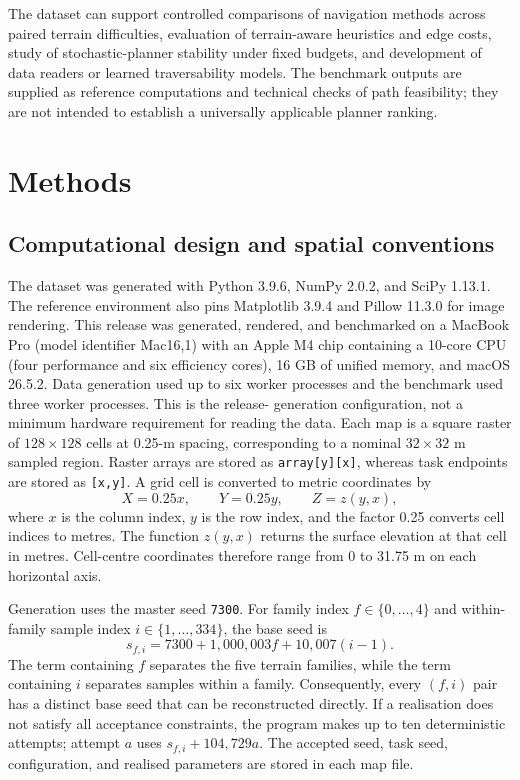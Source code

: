 \documentclass[11pt]{article}
\begin{document}
The dataset can support controlled comparisons of navigation methods across
paired terrain difficulties, evaluation of terrain-aware heuristics and edge
costs, study of stochastic-planner stability under fixed budgets, and
development of data readers or learned traversability models. The benchmark
outputs are supplied as reference computations and technical checks of path
feasibility; they are not intended to establish a universally applicable
planner ranking.

\section{Methods}

\subsection{Computational design and spatial conventions}

The dataset was generated with Python 3.9.6, NumPy 2.0.2, and SciPy
1.13.1\cite{numpy,scipy}. The reference environment also pins Matplotlib 3.9.4
and Pillow 11.3.0 for image rendering. This release was generated, rendered,
and benchmarked on a MacBook Pro (model identifier Mac16,1) with an Apple M4
chip containing a 10-core CPU (four performance and six efficiency cores),
16 GB of unified memory, and macOS 26.5.2. Data generation used up to six worker
processes and the benchmark used three worker processes. This is the release-
generation configuration, not a minimum hardware requirement for reading the
data. Each map is a square raster of $128\times128$ cells at 0.25-m spacing,
corresponding to a nominal $32\times32$ m sampled region. Raster arrays are
stored as \texttt{array[y][x]}, whereas task endpoints are stored as
\texttt{[x,y]}. A grid cell is converted to metric coordinates by
\begin{equation}
  X=0.25x, \qquad Y=0.25y, \qquad Z=z(y,x),
\end{equation}
where $x$ is the column index, $y$ is the row index, and the factor 0.25
converts cell indices to metres. The function $z(y,x)$ returns the surface
elevation at that cell in metres. Cell-centre coordinates
therefore range from 0 to 31.75 m on each horizontal axis.

Generation uses the master seed \texttt{7300}. For family index
$f\in\{0,\ldots,4\}$ and within-family sample index
$i\in\{1,\ldots,334\}$, the base seed is
\begin{equation}
  s_{f,i}=7300+1{,}000{,}003f+10{,}007(i-1).
\end{equation}
The term containing $f$ separates the five terrain families, while the term
containing $i$ separates samples within a family. Consequently, every $(f,i)$
pair has a distinct base seed that can be reconstructed directly.
If a realisation does not satisfy all acceptance constraints, the program
makes up to ten deterministic attempts; attempt $a$ uses
$s_{f,i}+104{,}729a$. The accepted seed, task seed, configuration, and realised
parameters are stored in each map file.
\end{document}
